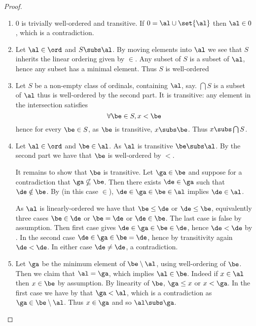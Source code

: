 \begin{proof}~
    \begin{enumerate}
        \item $0$ is trivially well-ordered and transitive.
            If $0 = \al \cup \set{\al}$ then $\al \in 0$, 
            which is a contradiction.
        \item Let $\al \in \ord$ and $S \subs \al$.
            By moving elements into $\al$ we see that $S$ 
            inherits the linear ordering given by $\in$.
            Any subset of $S$ is a subset of $\al$,
            hence any subset has a minimal element.
            Thus $S$ is well-ordered
        \item Let $S$ be a non-empty class of ordinals, containing $\al$, say.
            $\bigcap S$ is a subset of $\al$ thus is
            well-ordered by the second part. 
            It is transitive: any element in the intersection satisfies 
            \[\forall \be \in S, x < \be\] 
            hence for every $\be \in S$, as $\be$ is transitive, $x \subs \be$.
            Thus $x \subs \bigcap S$.
        \item Let $\al \in \ord$ and $\be \in \al$.
            As $\al$ is transitive $\be \subs \al$.
            By the second part we have that $\be$ is well-ordered by $<$.

            It remains to show that $\be$ is transitive.
            Let $\ga \in \be$ and suppose for a contradiction that 
            $\ga \nsubseteq \be$.
            Then there exists $\de \in \ga$ such that $\de \notin \be$.
            By 
            (in this case $\in$), 
            $\de \in \ga \in \be \in \al$ implies $\de \in \al$.
            
            As $\al$ is linearly-ordered we have that $\be \leq \de$ or 
            $\de \leq \be$, equivalently three cases
            $\be \in \de$ or $\be = \de$ or $\de \in \be$.
            The last case is false by assumption. 
            Then first case gives $\de \in \ga \in \be \in \de$,
            hence $\de < \de$ by .
            In the second case $\de \in \ga \in \be  = \de$,
            hence by transitivity again $\de < \de$.
            In either case $\de \ne \de$, a contradiction.
        \item Let $\ga$ be the minimum element of $\be \setminus \al$,
            using well-ordering of $\be$.
            Then we claim that $\al = \ga$, which implies $\al \in \be$.
            Indeed if $x \in \al$ then $x \in \be$ by assumption.
            By linearity of $\be$, 
            $\ga \leq x$ or $x < \ga$.
            In the first case we have by 
             that 
            $\ga < \al$, which is a contradiction as 
            $\ga \in \be \setminus \al$.
            Thus $x \in \ga$ and so $\al \subs \ga$.


\end{enumerate}
\end{proof}
